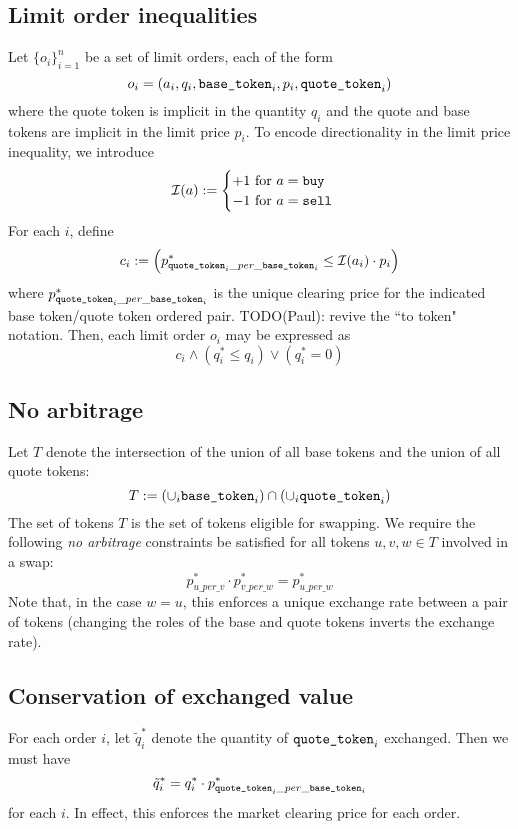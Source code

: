 \documentclass[11pt, reqno]{amsart}
\theoremstyle{definition}
\theoremstyle{remark}
\newcommand{\basetoken}{\textnormal{\texttt{base\_token}}}
\newcommand{\quotetoken}{\textnormal{\texttt{quote\_token}}}
\newcommand{\buy}{\textnormal{\texttt{buy}}}
\newcommand{\sell}{\textnormal{\texttt{sell}}}
\begin{document}
\subsection{Limit order inequalities}
Let $\{o_i\}_{i = 1}^n$ be a set of limit orders, each of the form
\[
	o_i = (a_i, q_i, \basetoken_i, p_i, \quotetoken_i)
\]
where the quote token is implicit in the quantity $q_i$ and the quote and base
tokens are implicit in the limit price $p_i$.
To encode directionality in the limit price inequality, we introduce
\[
	\mathcal{I}(a) :=
	\begin{cases}
		+1 \text{ for } a = \buy  \\
		-1 \text{ for } a = \sell \\
	\end{cases}
\]
For each $i$, define
\[
	c_i := \left(
	p^*_{\quotetoken_i\_per\_\basetoken_i} \leq \mathcal{I}(a_i) \cdot p_i
	\right)
\]
where $p^*_{\quotetoken_i\_per\_\basetoken_i}$ is the unique clearing price for
the indicated base token/quote token ordered pair.
TODO(Paul): revive the ``to token" notation.
Then, each limit order $o_i$ may be expressed as
\[
	c_i \land
	(q_i^* \leq q_i) \lor
	(q_i^* = 0)
\]

\subsection{No arbitrage}
Let $T$ denote the intersection of the union of all base tokens and the union
of all quote tokens:
\[
	T :=
	\left( \cup_i \basetoken_i \right)
	\cap
	\left( \cup_i \quotetoken_i \right)
\]
The set of tokens $T$ is the set of tokens eligible for swapping.
We require the following \emph{no arbitrage}
constraints be satisfied for all tokens $u, v, w \in T$
involved in a swap:
\[
	p^*_{u\_per\_v} \cdot
	p^*_{v\_per\_w} =
	p^*_{u\_per\_w}
\]
Note that, in the case $w = u$, this enforces a unique exchange rate between
a pair of tokens (changing the roles of the base and quote tokens inverts the
exchange rate).

\subsection{Conservation of exchanged value}

For each order $i$, let $\tilde{q}_i^*$ denote the quantity of
$\quotetoken_i$ exchanged. Then we must have
\[
	\tilde{q}_i^* = q_i^* \cdot p_{\quotetoken_i\_per\_\basetoken_i}^*
\]
for each $i$. In effect, this enforces the market clearing price for each
order.
\end{document}
